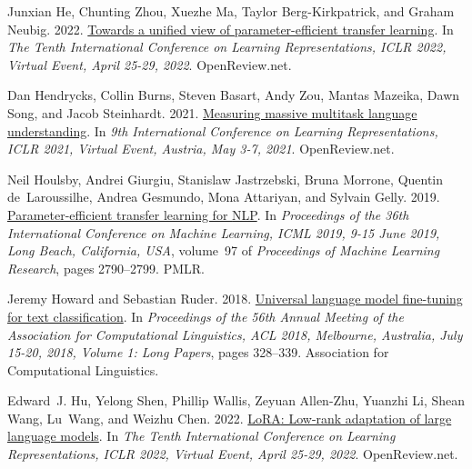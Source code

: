 \documentclass[11pt,dvipsnames]{article}
\begin{document}
{\begin{thebibliography}{73}
Junxian He, Chunting Zhou, Xuezhe Ma, Taylor Berg{-}Kirkpatrick, and Graham
  Neubig. 2022{}.
\newblock \href {https://openreview.net/forum?id=0RDcd5Axok} {Towards a unified
  view of parameter-efficient transfer learning}.
\newblock In \emph{The Tenth International Conference on Learning
  Representations, {ICLR} 2022, Virtual Event, April 25-29, 2022}.
  OpenReview.net.

Dan Hendrycks, Collin Burns, Steven Basart, Andy Zou, Mantas Mazeika, Dawn
  Song, and Jacob Steinhardt. 2021.
\newblock \href {https://openreview.net/forum?id=d7KBjmI3GmQ} {Measuring
  massive multitask language understanding}.
\newblock In \emph{9th International Conference on Learning Representations,
  {ICLR} 2021, Virtual Event, Austria, May 3-7, 2021}. OpenReview.net.

Neil Houlsby, Andrei Giurgiu, Stanislaw Jastrzebski, Bruna Morrone, Quentin
  de~Laroussilhe, Andrea Gesmundo, Mona Attariyan, and Sylvain Gelly. 2019.
\newblock \href {http://proceedings.mlr.press/v97/houlsby19a.html}
  {Parameter-efficient transfer learning for {NLP}}.
\newblock In \emph{Proceedings of the 36th International Conference on Machine
  Learning, {ICML} 2019, 9-15 June 2019, Long Beach, California, {USA}},
  volume~97 of \emph{Proceedings of Machine Learning Research}, pages
  2790--2799. {PMLR}.

Jeremy Howard and Sebastian Ruder. 2018.
\newblock \href {https://doi.org/10.18653/v1/P18-1031} {Universal language
  model fine-tuning for text classification}.
\newblock In \emph{Proceedings of the 56th Annual Meeting of the Association
  for Computational Linguistics, {ACL} 2018, Melbourne, Australia, July 15-20,
  2018, Volume 1: Long Papers}, pages 328--339. Association for Computational
  Linguistics.

Edward~J. Hu, Yelong Shen, Phillip Wallis, Zeyuan Allen{-}Zhu, Yuanzhi Li,
  Shean Wang, Lu~Wang, and Weizhu Chen. 2022.
\newblock \href {https://openreview.net/forum?id=nZeVKeeFYf9} {{LoRA}: Low-rank
  adaptation of large language models}.
\newblock In \emph{The Tenth International Conference on Learning
  Representations, {ICLR} 2022, Virtual Event, April 25-29, 2022}.
  OpenReview.net.


\end{thebibliography}}
\end{document}
